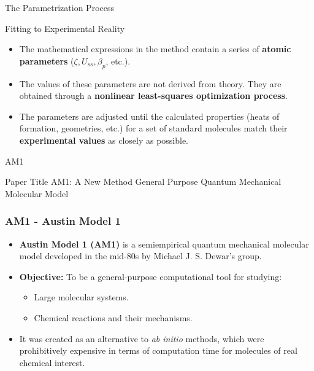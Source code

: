 \begin{frame}{The Parametrization Process}
    \begin{block}{Fitting to Experimental Reality}
        \begin{itemize}
            \item The mathematical expressions in the method contain a series of \textbf{atomic parameters} ($\zeta, U_{ss}, \beta_p$, etc.).
            \pause
            \bigskip
            \item The values of these parameters are not derived from theory. They are obtained through a \textbf{nonlinear least-squares optimization process}.
            \pause
            \bigskip
            \item The parameters are adjusted until the calculated properties (heats of formation, geometries, etc.) for a set of standard molecules match their \textbf{experimental values} as closely as possible.
        \end{itemize}
    \end{block}
\end{frame}


\begin{frame}{AM1}
	\begin{block}{Paper Title}
	AM1: A New Method General Purpose Quantum Mechanical Molecular Model
	\end{block}
\end{frame}

\begin{frame}
  \frametitle{AM1 - Austin Model 1}
  
  \begin{itemize}
    \item \textbf{Austin Model 1 (AM1)} is a semiempirical quantum mechanical molecular model developed in the mid-80s by Michael J. S. Dewar's group. \pause
    \item \textbf{Objective:} To be a general-purpose computational tool for studying: \pause
    \begin{itemize}
        \item Large molecular systems. \pause
        \item Chemical reactions and their mechanisms. \pause
    \end{itemize}
    \item It was created as an alternative to \textit{ab initio} methods, which were prohibitively expensive in terms of computation time for molecules of real chemical interest.
  \end{itemize}
\end{frame}

